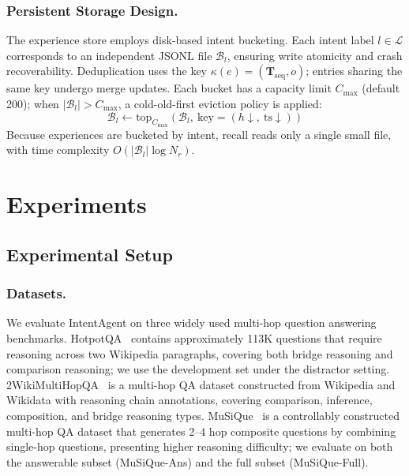 \documentclass[runningheads]{llncs}
\begin{document}
\subsubsection{Persistent Storage Design.}

The experience store employs disk-based intent bucketing. Each intent label $l \in \mathcal{L}$ corresponds to an independent JSONL file $\mathcal{B}_l$, ensuring write atomicity and crash recoverability. Deduplication uses the key $\kappa(e) = (\mathbf{T}_{\text{seq}}, o)$; entries sharing the same key undergo merge updates. Each bucket has a capacity limit $C_{\max}$ (default 200); when $|\mathcal{B}_l| > C_{\max}$, a cold-old-first eviction policy is applied:
\begin{equation}
    \mathcal{B}_l \leftarrow \text{top}_{C_{\max}}\!\left(\mathcal{B}_l,\ \text{key} = (h \downarrow,\ \text{ts} \downarrow)\right)
\end{equation}
Because experiences are bucketed by intent, recall reads only a single small file, with time complexity $O(|\mathcal{B}_l| \log N_r)$.


\section{Experiments}

\subsection{Experimental Setup}

\subsubsection{Datasets.}

We evaluate IntentAgent on three widely used multi-hop question answering benchmarks. HotpotQA~\cite{ref20} contains approximately 113K questions that require reasoning across two Wikipedia paragraphs, covering both bridge reasoning and comparison reasoning; we use the development set under the distractor setting. 2WikiMultiHopQA~\cite{ref21} is a multi-hop QA dataset constructed from Wikipedia and Wikidata with reasoning chain annotations, covering comparison, inference, composition, and bridge reasoning types. MuSiQue~\cite{ref22} is a controllably constructed multi-hop QA dataset that generates 2--4 hop composite questions by combining single-hop questions, presenting higher reasoning difficulty; we evaluate on both the answerable subset (MuSiQue-Ans) and the full subset (MuSiQue-Full).
\end{document}
